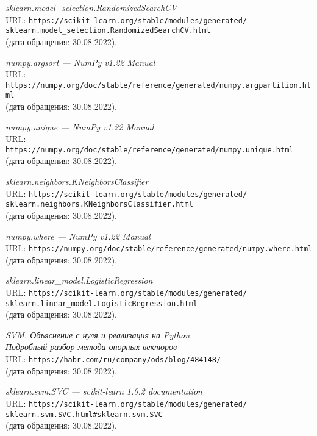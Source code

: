 \begin{thebibliography}{99}
{\itshape sklearn.model\_selection.RandomizedSearchCV}\\
URL: \texttt{https://scikit-learn.org/stable/modules/generated/\\sklearn.model\_selection.RandomizedSearchCV.html}\\
(дата обращения: 30.08.2022).

{\itshape numpy.argsort --- NumPy v1.22 Manual}\\
URL: \texttt{https://numpy.org/doc/stable/reference/generated/numpy.argpartition.html}\\
(дата обращения: 30.08.2022).

{\itshape numpy.unique --- NumPy v1.22 Manual}\\
URL: \texttt{https://numpy.org/doc/stable/reference/generated/numpy.unique.html}\\
(дата обращения: 30.08.2022).

{\itshape sklearn.neighbors.KNeighborsClassifier}\\
URL: \texttt{https://scikit-learn.org/stable/modules/generated/\\sklearn.neighbors.KNeighborsClassifier.html}\\
(дата обращения: 30.08.2022).

{\itshape numpy.where --- NumPy v1.22 Manual}\\
URL: \texttt{https://numpy.org/doc/stable/reference/generated/numpy.where.html}\\
(дата обращения: 30.08.2022).

{\itshape sklearn.linear\_model.LogisticRegression}\\
URL: \texttt{https://scikit-learn.org/stable/modules/generated/\\sklearn.linear\_model.LogisticRegression.html}\\
(дата обращения: 30.08.2022).

{\itshape SVM. Объяснение с нуля и реализация на Python.\\Подробный разбор метода опорных векторов}\\
URL: \texttt{https://habr.com/ru/company/ods/blog/484148/}\\
(дата обращения: 30.08.2022).

{\itshape sklearn.svm.SVC --- scikit-learn 1.0.2 documentation}\\
URL: \texttt{https://scikit-learn.org/stable/modules/generated/\\sklearn.svm.SVC.html\#sklearn.svm.SVC}\\
(дата обращения: 30.08.2022).


\end{thebibliography}
